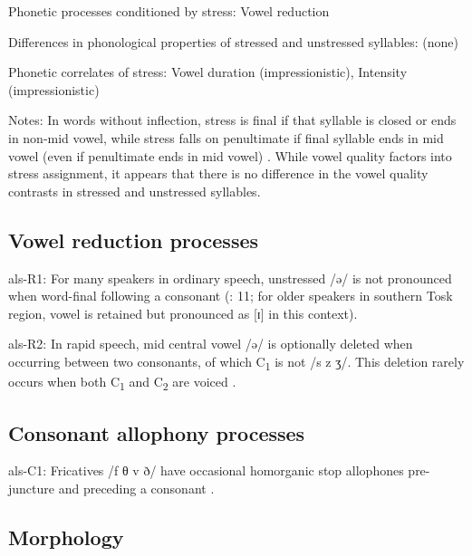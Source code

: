 {\begin{appendixdesc}
\item[Phonetic processes conditioned by stress:] Vowel reduction

\item[Differences in phonological properties of stressed and unstressed syllables:] (none)

\item[Phonetic correlates of stress:] Vowel duration (impressionistic), Intensity (impressionistic)

\item[Notes:] In words without inflection, stress is final if that syllable is closed or ends in non-mid vowel, while stress falls on penultimate if final syllable ends in mid vowel (even if penultimate ends in mid vowel) \citep{Trommer2013}. While vowel quality factors into stress assignment, it appears that there is no difference in the vowel quality contrasts in stressed and unstressed syllables.
\end{appendixdesc}
\subsection*{Vowel reduction processes}
\begin{appendixdesc}

\item[als-R1:] For many speakers in ordinary speech, unstressed /ə/ is not pronounced when word-final following a consonant (\citealt{NewmarkEtAl1982}: 11; for older speakers in southern Tosk region, vowel is retained but pronounced as [ɪ] in this context).

\item[als-R2:] In rapid speech, mid central vowel /ə/ is optionally deleted when occurring between two consonants, of which C\textsubscript{1} is not /s z ʒ/. This deletion rarely occurs when both C\textsubscript{1} and C\textsubscript{2} are voiced \citep[21--22]{Klippenstein2010}.
\end{appendixdesc}
\subsection*{Consonant allophony processes}
\begin{appendixdesc}

\item[als-C1:] Fricatives /f θ v ð/ have occasional homorganic stop allophones pre-juncture and preceding a consonant \citep{Newmark1957}.
\end{appendixdesc}
\subsection*{Morphology}

}
